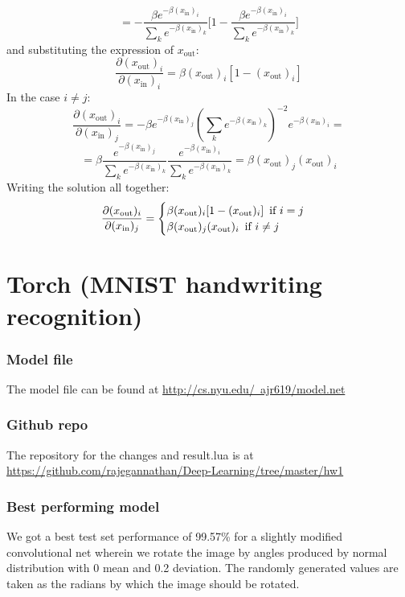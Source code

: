 \documentclass{article}
\begin{document}
\begin{enumerate}
$$
=-\frac{\beta e^{-\beta (x_{\text{in}})_i}}{\sum_k e^{-\beta (x_{\text{in}})_k} } \Big[  1-\frac{\beta e^{-\beta (x_{\text{in}})_i}}{\sum_k e^{-\beta (x_{\text{in}})_k} }\Big]
$$and substituting the expression of $x_{\text{out}}$:
$$
\frac{\partial (x_{\text{out}})_i}{\partial (x_{\text{in}})_i} =\beta  (x_{\text{out}})_i [1- (x_{\text{out}})_i]
$$
In the case $i\neq j$:
$$
\frac{\partial (x_{\text{out}})_i}{\partial (x_{\text{in}})_j} =    
-\beta e^{-\beta (x_{\text{in}})_j} (\sum_k e^{-\beta (x_{\text{in}})_k} )^{-2} e^{-\beta (x_{\text{in}})_i} =
$$ 
$$
=\beta \frac{e^{-\beta (x_{\text{in}})_j}}{\sum_k e^{-\beta (x_{\text{in}})_k} }
\frac{e^{-\beta (x_{\text{in}})_i}}{\sum_k e^{-\beta (x_{\text{in}})_k} } =\beta (x_{\text{out}})_j(x_{\text{out}})_i 
$$
Writing the solution all together:
\begin{equation*}
      \frac{\partial (x_{\text{out}})_i}{\partial (x_{\text{in}})_j} = \begin{cases}
                       \beta  (x_{\text{out}})_i [1- (x_{\text{out}})_i]   \text{\,	if  $i= j$}\\
                        \beta (x_{\text{out}})_j(x_{\text{out}})_i   \text{\,	if  $i\neq j$}
                    \end{cases}
\end{equation*}

\end{enumerate}

\section[Kaggle contest]{Torch (MNIST handwriting recognition)}

\subsubsection{Model file}
  The model file can be found at \href{http://cs.nyu.edu/~ajr619/model.net}{http://cs.nyu.edu/~ajr619/model.net}
\subsubsection{Github repo}
  The repository for the changes and result.lua is at \\
  \href{https://github.com/rajegannathan/Deep-Learning/tree/master/hw1}{https://github.com/rajegannathan/Deep-Learning/tree/master/hw1}
\subsubsection{Best performing model}
  We got a best test set performance of 99.57\% for a slightly modified convolutional net wherein we rotate the image by angles produced by normal distribution with 0 mean and 0.2 deviation.  The randomly generated values are taken as the radians by which the image should be rotated.
\end{document}
